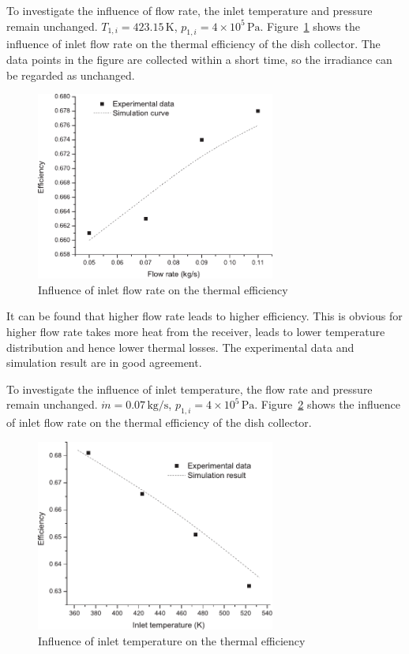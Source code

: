 To investigate the influence of flow rate, the inlet temperature and pressure remain unchanged. $T_{1,i} = 423.15\,\mathrm{K}$, $p_{1,i} = 4\times10^5\,\mathrm{Pa}$. Figure~\ref{fig:q_m-eta} shows the influence of inlet flow rate on the thermal efficiency of the dish collector. The data points in the figure are collected within a short time, so the irradiance can be regarded as unchanged.
\begin{figure}[!ht]
\centering
\includegraphics[width=0.7\textwidth]{fig/q_m-eta}
\caption{Influence of inlet flow rate on the thermal efficiency}
\label{fig:q_m-eta}
\end{figure}

It can be found that higher flow rate leads to higher efficiency. This is obvious for higher flow rate takes more heat from the receiver, leads to lower temperature distribution and hence lower thermal losses. The experimental data and simulation result are in good agreement.

To investigate the influence of inlet temperature, the flow rate and pressure remain unchanged. $\dot{m} = 0.07\,\mathrm{kg/s}$, $p_{1,i} = 4\times10^5\,\mathrm{Pa}$. Figure~\ref{fig:T_i-eta} shows the influence of inlet flow rate on the thermal efficiency of the dish collector.
\begin{figure}[!ht]
\centering
\includegraphics[width=0.7\textwidth]{fig/T_i-eta}
\caption{Influence of inlet temperature on the thermal efficiency}
\label{fig:T_i-eta}
\end{figure}

